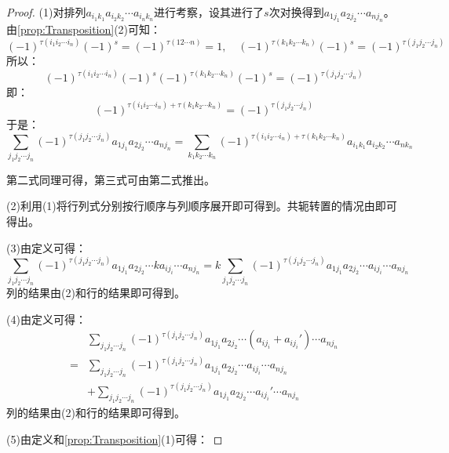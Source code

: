 \begin{proof}
	(1)对排列$a_{i_1k_1}a_{i_2k_2}\cdots a_{i_nk_n}$进行考察，设其进行了$s$次对换得到$a_{1j_1}a_{2j_2}\cdots a_{nj_n}$。由\cref{prop:Transposition}(2)可知：
	\begin{equation*}
		(-1)^{\tau(i_1i_2\cdots i_n)}(-1)^{s}=(-1)^{\tau(12\cdots n)}=1,\quad
		(-1)^{\tau(k_1k_2\cdots k_n)}(-1)^{s}=(-1)^{\tau(j_1j_2\cdots j_n)}
	\end{equation*}
	所以：
	\begin{equation*}
		(-1)^{\tau(i_1i_2\cdots i_n)}(-1)^{s}(-1)^{\tau(k_1k_2\cdots k_n)}(-1)^{s}=(-1)^{\tau(j_1j_2\cdots j_n)}
	\end{equation*}
	即：
	\begin{equation*}
		(-1)^{\tau(i_1i_2\cdots i_n)+\tau(k_1k_2\cdots k_n)}=(-1)^{\tau(j_1j_2\cdots j_n)}
	\end{equation*}
	于是：
	\begin{equation*}
		\sum_{j_1j_2\cdots j_n}^{}(-1)^{\tau(j_1j_2\cdots j_n)}a_{1j_1}a_{2j_2}\cdots a_{nj_n}=\sum_{k_1k_2\cdots k_n}^{}(-1)^{\tau(i_1i_2\cdots i_n)+\tau(k_1k_2\cdots k_n)}a_{i_1k_1}a_{i_2k_2}\cdots a_{nk_n}
	\end{equation*}\par
	第二式同理可得，第三式可由第二式推出。\par
	(2)利用(1)将行列式分别按行顺序与列顺序展开即可得到。共轭转置的情况由即可得出。\par
	(3)由定义可得：
	\begin{equation*}
		\sum_{j_1j_2\cdots j_n}^{}(-1)^{\tau(j_1j_2\cdots j_n)}a_{1j_1}a_{2j_2}\cdots ka_{ij_i}\cdots a_{nj_n}=k\sum_{j_1j_2\cdots j_n}^{}(-1)^{\tau(j_1j_2\cdots j_n)}a_{1j_1}a_{2j_2}\cdots a_{ij_i}\cdots a_{nj_n}
	\end{equation*}
	列的结果由(2)和行的结果即可得到。\par
	(4)由定义可得：
	\begin{align*}
		&\sum_{j_1j_2\cdots j_n}^{}(-1)^{\tau(j_1j_2\cdots j_n)}a_{1j_1}a_{2j_2}\cdots (a_{ij_i}+a_{ij_i}')\cdots a_{nj_n} \\
		=&\sum_{j_1j_2\cdots j_n}^{}(-1)^{\tau(j_1j_2\cdots j_n)}a_{1j_1}a_{2j_2}\cdots a_{ij_i}\cdots a_{nj_n} \\
		&+\sum_{j_1j_2\cdots j_n}^{}(-1)^{\tau(j_1j_2\cdots j_n)}a_{1j_1}a_{2j_2}\cdots a_{ij_i}'\cdots a_{nj_n}
	\end{align*}
	列的结果由(2)和行的结果即可得到。\par
	(5)由定义和\cref{prop:Transposition}(1)可得：

\end{proof}

